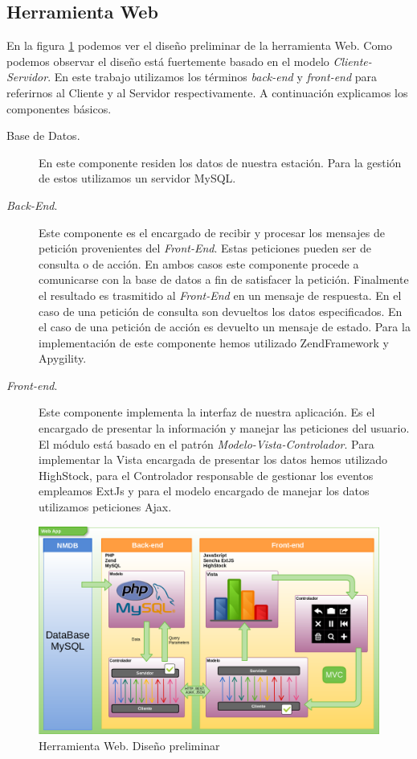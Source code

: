 	\subsection{Herramienta Web}
		En la figura \ref{fig:herramienta_web_preliminar} podemos ver el diseño preliminar de la herramienta Web. Como podemos observar el
		diseño está fuertemente basado en el modelo \emph{Cliente-Servidor}\cite{MVCWiki}. En este trabajo utilizamos los términos
		\emph{back-end} y \emph{front-end} para referirnos al Cliente y al Servidor respectivamente. A continuación explicamos los componentes
		básicos.
		\begin{description}
			\item[Base de Datos.]    
				En este componente residen los datos de nuestra estación. Para la gestión de estos utilizamos un servidor
				MySQL\cite{MySql}.
			\item[\emph{Back-End}.]
				Este componente es el encargado de recibir y procesar los mensajes de petición provenientes del \emph{Front-End}.
				Estas peticiones pueden ser de consulta o de acción. En ambos casos este componente procede a comunicarse con la base
				de datos a fin de satisfacer la petición. Finalmente el resultado es trasmitido al \emph{Front-End} en un mensaje de
				respuesta. En el caso de una petición de consulta son devueltos los datos especificados. En el caso de una petición de
				acción es devuelto un mensaje de estado. Para la implementación de este componente hemos utilizado
				ZendFramework\cite{ZF} y Apygility\cite{Apigility}.
			\item[\emph{Front-end}.] 
				Este componente implementa la interfaz de nuestra aplicación. Es el encargado de presentar la información y manejar
				las peticiones del usuario. El módulo está basado en el patrón \emph{Modelo-Vista-Controlador}. Para implementar la
				Vista encargada de presentar los datos hemos utilizado HighStock\cite{HighStock}, para el Controlador responsable de
				gestionar los eventos empleamos ExtJs\cite{ExtJs} y para el modelo encargado de manejar los datos utilizamos
				peticiones Ajax\cite{AjaxWiki}.
		\end{description}
		\begin{figure}[h]
			\centering
			\includegraphics[keepaspectratio, width=1\textwidth]{./img/herramienta_web_preliminar.png}
			\caption{Herramienta Web. Diseño preliminar}
			\label{fig:herramienta_web_preliminar}
		\end{figure}
